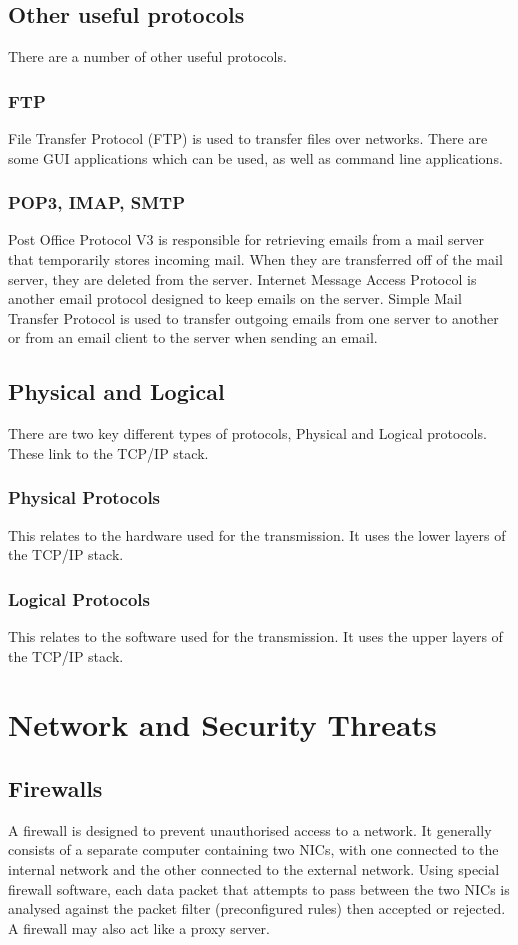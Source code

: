 \documentclass[a4paper,11pt, twocolumn]{article}
\begin{document}
\subsection{Other useful protocols}
There are a number of other useful protocols.
\subsubsection{FTP}
File Transfer Protocol (FTP) is used to transfer files over networks. There are some GUI applications which can be used, as well as command line applications.
\subsubsection{POP3, IMAP, SMTP}
Post Office Protocol V3 is responsible for retrieving emails from a mail server that temporarily stores incoming mail. When they are transferred off of the mail server, they are deleted from the server. Internet Message Access Protocol is another email protocol designed to keep emails on the server. Simple Mail Transfer Protocol is used to transfer outgoing emails from one server to another or from an email client to the server when sending an email. 
\subsection{Physical and Logical}
There are two key different types of protocols, Physical and Logical protocols. These link to the TCP/IP stack.
\subsubsection{Physical Protocols}
This relates to the hardware used for the transmission. It uses the lower layers of the TCP/IP stack.
\subsubsection{Logical Protocols}
This relates to the software used for the transmission. It uses the upper layers of the TCP/IP stack.

\section{Network and Security Threats}
\subsection{Firewalls}
A firewall is designed to prevent unauthorised access to a network. It generally consists of a separate computer containing two NICs, with one connected to the internal network and the other connected to the external network. Using special firewall software, each data packet that attempts to pass between the two NICs is analysed against the packet filter (preconfigured rules) then accepted or rejected. A firewall may also act like a proxy server. 
\end{document}
